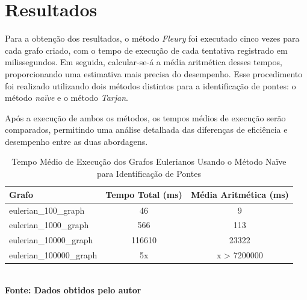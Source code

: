 \section{\esp Resultados}

Para a obtenção dos resultados, o método \textit{Fleury} foi executado cinco vezes para cada grafo criado, com o tempo de execução de cada tentativa registrado em milissegundos. Em seguida, calcular-se-á a média aritmética desses tempos, proporcionando uma estimativa mais precisa do desempenho. Esse procedimento foi  realizado utilizando dois métodos distintos para a identificação de pontes: o método \textit{naïve} e o método \textit{Tarjan}.


Após a execução de ambos os métodos, os tempos médios de execução serão comparados, permitindo uma análise detalhada das diferenças de eficiência e desempenho entre as duas abordagens.


\begin{table}[htb]
	\centering
	\caption{\hspace{0.1cm} Tempo Médio de Execução dos Grafos Eulerianos Usando o Método Naïve para Identificação de Pontes }
	\vspace{-0.3cm} %
	\label{tab:tempo_execucao_naive}
	\begin{tabular}{l|c|c}
    \hline
    \textbf{Grafo} & \textbf{Tempo Total (ms)} & \textbf{Média Aritmética (ms)} \\
    \hline
     eulerian\_100\_graph & 46 & 9 \\
     eulerian\_1000\_graph & 566 & 113 \\
     eulerian\_10000\_graph & 116610 & 23322 \\
     eulerian\_100000\_graph & 5x & x > 7200000 \\
    \hline
 \end{tabular}
 	\vspace{.1cm}  %
	\small
	{\footnotesize\\ \textbf{Fonte: Dados obtidos pelo autor}}
\end{table}

